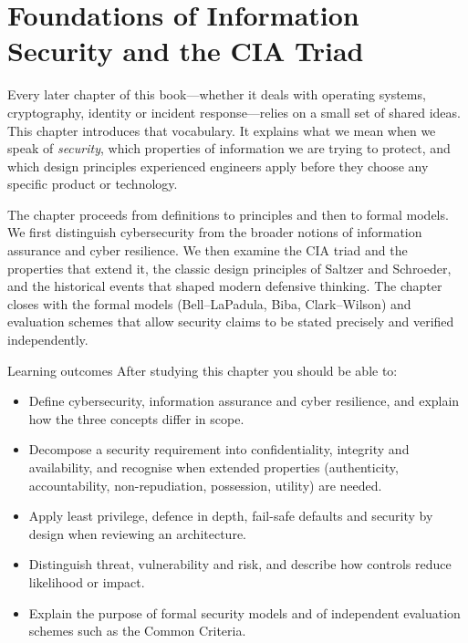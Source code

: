 \chapter{Foundations of Information Security and the CIA Triad}\label{ch:1}

Every later chapter of this book—whether it deals with operating systems, cryptography, identity or incident response—relies on a small set of shared ideas. This chapter introduces that vocabulary. It explains what we mean when we speak of \emph{security}, which properties of information we are trying to protect, and which design principles experienced engineers apply before they choose any specific product or technology.

The chapter proceeds from definitions to principles and then to formal models. We first distinguish cybersecurity from the broader notions of information assurance and cyber resilience. We then examine the CIA triad and the properties that extend it, the classic design principles of Saltzer and Schroeder, and the historical events that shaped modern defensive thinking. The chapter closes with the formal models (Bell–LaPadula, Biba, Clark–Wilson) and evaluation schemes that allow security claims to be stated precisely and verified independently.

\begin{outcomesbox}{Learning outcomes}
After studying this chapter you should be able to:
\begin{itemize}
  \item Define cybersecurity, information assurance and cyber resilience, and explain how the three concepts differ in scope.
  \item Decompose a security requirement into confidentiality, integrity and availability, and recognise when extended properties (authenticity, accountability, non-repudiation, possession, utility) are needed.
  \item Apply least privilege, defence in depth, fail-safe defaults and security by design when reviewing an architecture.
  \item Distinguish threat, vulnerability and risk, and describe how controls reduce likelihood or impact.
  \item Explain the purpose of formal security models and of independent evaluation schemes such as the Common Criteria.
\end{itemize}
\end{outcomesbox}

